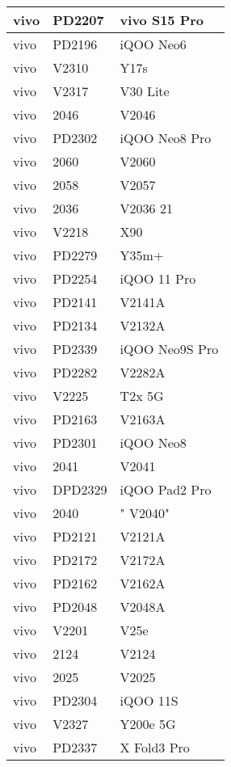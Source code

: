 \begin{tabularx}{\linewidth}{|l|X|X|}
        vivo & PD2207 & vivo S15 Pro \\ \hline
        vivo & PD2196 & iQOO Neo6 \\ \hline
        vivo & V2310 & Y17s \\ \hline
        vivo & V2317 & V30 Lite \\ \hline
        vivo & 2046 & V2046 \\ \hline
        vivo & PD2302 & iQOO Neo8 Pro \\ \hline
        vivo & 2060 & V2060 \\ \hline
        vivo & 2058 & V2057 \\ \hline
        vivo & 2036 & V2036 21 \\ \hline
        vivo & V2218 & X90 \\ \hline
        vivo & PD2279 & Y35m+ \\ \hline
        vivo & PD2254 & iQOO 11 Pro \\ \hline
        vivo & PD2141 & V2141A \\ \hline
        vivo & PD2134 & V2132A \\ \hline
        vivo & PD2339 & iQOO Neo9S Pro \\ \hline
        vivo & PD2282 & V2282A \\ \hline
        vivo & V2225 & T2x 5G \\ \hline
        vivo & PD2163 & V2163A \\ \hline
        vivo & PD2301 & iQOO Neo8 \\ \hline
        vivo & 2041 & V2041 \\ \hline
        vivo & DPD2329 & iQOO Pad2 Pro \\ \hline
        vivo & 2040 & "	V2040" \\ \hline
        vivo & PD2121 & V2121A \\ \hline
        vivo & PD2172 & V2172A \\ \hline
        vivo & PD2162 & V2162A \\ \hline
        vivo & PD2048 & V2048A \\ \hline
        vivo & V2201 & V25e \\ \hline
        vivo & 2124 & V2124 \\ \hline
        vivo & 2025 & V2025 \\ \hline
        vivo & PD2304 & iQOO 11S \\ \hline
        vivo & V2327 & Y200e 5G \\ \hline
        vivo & PD2337 & X Fold3 Pro \\ \hline

\end{tabularx}
